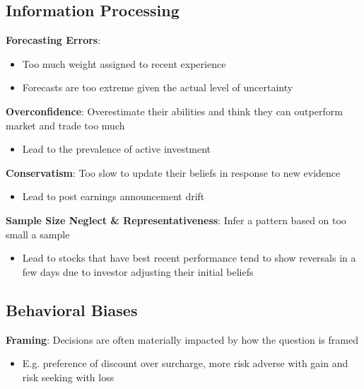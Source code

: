 \documentclass[]{book}
\providecommand{\tightlist}{%
  \setlength{\itemsep}{0pt}\setlength{\parskip}{0pt}}
\theoremstyle{definition}
\theoremstyle{definition}
\theoremstyle{remark}
\begin{document}
\subsection{Information Processing}\label{information-processing}

\textbf{Forecasting Errors}:

\begin{itemize}
\tightlist
\item
  Too much weight assigned to recent experience
\item
  Forecasts are too extreme given the actual level of uncertainty
\end{itemize}

\textbf{Overconfidence}: Overestimate their abilities and think they can
outperform market and trade too much

\begin{itemize}
\tightlist
\item
  Lead to the prevalence of active investment
\end{itemize}

\textbf{Conservatism}: Too slow to update their beliefs in response to
new evidence

\begin{itemize}
\tightlist
\item
  Lead to post earnings announcement drift
\end{itemize}

\textbf{Sample Size Neglect \& Representativeness}: Infer a pattern
based on too small a sample

\begin{itemize}
\tightlist
\item
  Lead to stocks that have best recent performance tend to show
  reversals in a few days due to investor adjusting their initial
  beliefs
\end{itemize}

\subsection{Behavioral Biases}\label{behavioral-biases}

\textbf{Framing}: Decisions are often materially impacted by how the
question is framed

\begin{itemize}
\tightlist
\item
  E.g. preference of discount over surcharge, more risk adverse with
  gain and risk seeking with loss
\end{itemize}
\end{document}
